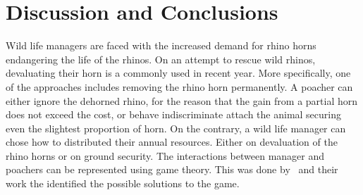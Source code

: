 \documentclass[10pt]{article}
\begin{document}



\section{Discussion and Conclusions}

Wild life managers are faced with the increased demand for rhino horns endangering
the life of the rhinos. On an attempt to rescue wild rhinos, devaluating their horn
is a commonly used in recent year.  More specifically, one of the approaches 
includes removing the rhino horn permanently.  A poacher can either
ignore the dehorned rhino, for the reason that the gain from a partial horn does
not exceed the cost, or behave indiscriminate attach the animal securing even
the slightest proportion of horn.  On the contrary, a wild
life manager can chose how to distributed their annual resources. Either
on devaluation of the rhino horns or on ground security. The interactions
between manager and poachers can be represented using game theory. This
was done by~\cite{Lee} and their work the identified the possible solutions
to the game.
\end{document}
